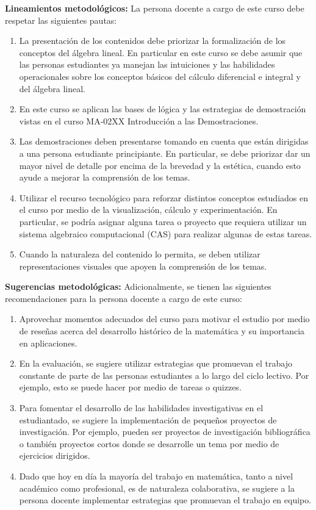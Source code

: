 \begin{refsection}
\noindent \textbf{Lineamientos metodológicos:} La persona docente a cargo de este curso debe respetar las siguientes pautas:
\begin{enumerate}
    \item La presentación de los contenidos debe priorizar la formalización de los conceptos del álgebra lineal. En particular en este curso se debe asumir que las personas estudiantes  ya manejan las intuiciones y las habilidades operacionales sobre los conceptos básicos del cálculo diferencial e integral y del álgebra lineal.
    \item En este curso se aplican las bases de lógica y las estrategias de demostración vistas en el curso MA-02XX Introducción a las Demostraciones.
    \item Las demostraciones deben presentarse tomando en cuenta que están dirigidas a una persona estudiante principiante. En particular, se debe priorizar dar un mayor nivel de detalle por encima de la brevedad y la estética, cuando esto ayude a mejorar la comprensión de los temas.
    \item Utilizar el recurso tecnológico para reforzar distintos conceptos estudiados en el curso por medio de la visualización, cálculo y experimentación. En particular, se podría asignar alguna tarea o proyecto que requiera utilizar un sistema algebraico computacional (CAS) para realizar algunas de estas tareas.
    \item Cuando la naturaleza del contenido lo permita, se deben utilizar representaciones visuales que apoyen la comprensión de los temas.
\end{enumerate}

\textbf{Sugerencias metodológicas:} Adicionalmente, se tienen las siguientes recomendaciones para la persona docente a cargo de este curso:
\begin{enumerate}
    \item Aprovechar momentos adecuados del curso para motivar el estudio por medio de reseñas acerca del desarrollo histórico de la matemática y su importancia en aplicaciones.
    \item En la evaluación, se sugiere utilizar estrategias que promuevan el trabajo constante de parte de las personas estudiantes a lo largo del ciclo lectivo. Por ejemplo, esto se puede hacer por medio de tareas o quizzes.
    \item Para fomentar el desarrollo de las habilidades investigativas en el estudiantado, se sugiere la implementación de pequeños proyectos de investigación. Por ejemplo, pueden ser proyectos de investigación bibliográfica o también proyectos cortos donde se desarrolle un tema por medio de ejercicios dirigidos.
    \item Dado que hoy en día la mayoría del trabajo en matemática, tanto a nivel académico como profesional, es de naturaleza colaborativa, se sugiere a la persona docente implementar estrategias que promuevan el trabajo en equipo.
\end{enumerate}





\end{refsection}
